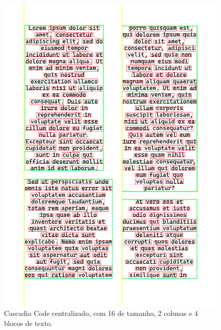 \documentclass[english, 
               brazil, 
               bsc] %
               {dcomp-abntex2}
\begin{document}
\begin{figure}[h]
        \caption{\label{cascadia16} \small Cascadia Code centralizado, com 16 de tamanho, 2 colunas e 4 blocos de texto. }
        \begin{center}
            \includegraphics[scale=0.25]{./images/cascadia_code_centralizado_tamanho_16_colunas_2_blocos_4_linhas_38_palavras_226.png}
        \end{center}
\end{figure}
\end{document}
